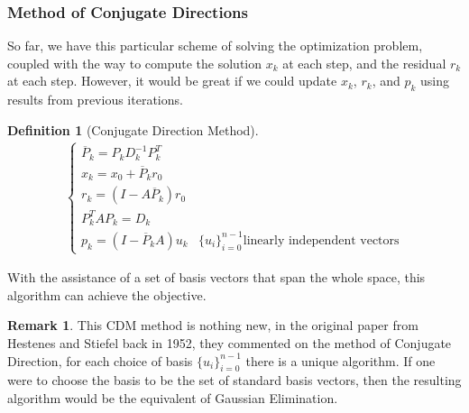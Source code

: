 \documentclass[]{article}
\theoremstyle{definition}
\newtheorem{definition}{Definition}      %
\newtheorem{remark}{Remark}[subsection]  %
\begin{document}
        \subsubsection{Method of Conjugate Directions}
            So far, we have this particular scheme of solving the optimization problem, coupled with the way to compute the solution $x_k$ at each step, and the residual $r_k$ at each step.  However, it would be great if
            we could update $x_k$, $r_k$, and $p_k$ using results from previous iterations.
            \begin{definition}[Conjugate Direction Method]
                \begin{align}
                    \begin{cases}
                        \overline{P}_k = P_kD^{-1}_kP_k^T
                        \\
                        x_k = x_0 + \overline{P}_k r_0
                        \\
                        r_k = (I - A\overline{P}_k) r_0
                        \\
                        P^T_kAP_k = D_k
                        \\
                        p_k = (I - \overline{P}_kA)u_k & \{u_i\}_{i = 0}^{n - 1} \text{linearly independent vectors}
                    \end{cases}
                \end{align}
            \end{definition}
            With the assistance of a set of basis vectors that span the whole space, this algorithm can achieve the objective. 
            \begin{remark}
                This CDM method is nothing new, in the original paper from Hestenes and Stiefel back in 1952\cite{paper:cg_original}, they commented on the method of Conjugate Direction, for each choice of basis $\{u_i\}_{i = 0}^{n-1}$ there is a unique algorithm. If one were to choose the basis to be the set of standard basis vectors, then the resulting algorithm would be the equivalent of  Gaussian Elimination. 
            \end{remark}
\end{document}
